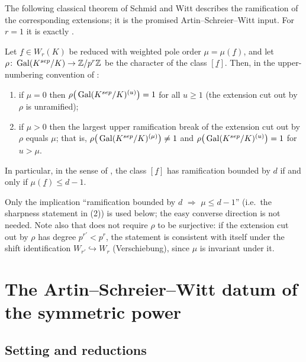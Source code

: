 \documentclass[11pt]{article}
\newcommand{\wv}[1]{\underline{#1}}                 %
\begin{document}
The following classical theorem of Schmid and Witt describes the
ramification of the corresponding extensions; it is the promised
Artin--Schreier--Witt input.  For $r=1$ it is exactly
.

\begin{theorem}\label{thm:schmid-witt}
Let $\wv f\in W_r(K)$ be reduced with weighted pole order $\mu=\mu(\wv f)$,
and let $\rho\colon\operatorname{Gal}(K^{sep}/K)\to\mathbb{Z}/p^r\mathbb{Z}$ be the character of the
class $[\wv f]$.  Then, in the upper-numbering convention of
:
\begin{enumerate}
  \item if $\mu=0$ then $\rho\big(\operatorname{Gal}(K^{sep}/K)^{(u)}\big)=1$ for all
        $u\ge 1$ (the extension cut out by $\rho$ is unramified);
  \item if $\mu>0$ then the largest upper ramification break of the
        extension cut out by $\rho$ equals $\mu$; that is,
        $\rho\big(\operatorname{Gal}(K^{sep}/K)^{(\mu)}\big)\neq 1$ and
        $\rho\big(\operatorname{Gal}(K^{sep}/K)^{(u)}\big)=1$ for $u>\mu$.
\end{enumerate}
In particular, in the sense of ,
the class $[\wv f]$ has ramification bounded by $d$ if and only if
$\mu(\wv f)\le d-1$.
\end{theorem}

\begin{rem*}
Only the implication ``ramification bounded by $d$ $\Rightarrow$
$\mu\le d-1$'' (i.e.\ the sharpness statement in (2)) is used below; the
easy converse direction is not needed.  Note also that
 does not require $\rho$ to be surjective: if the
extension cut out by $\rho$ has degree $p^{r'}<p^r$, the statement is
consistent with itself under the shift identification
$W_{r'}\hookrightarrow W_r$ (Verschiebung), since
$\mu$ is invariant under it.
\end{rem*}

\section{The Artin--Schreier--Witt datum of the symmetric power}\label{sec:datum}

\subsection{Setting and reductions}\label{subsec:reductions}
\end{document}
